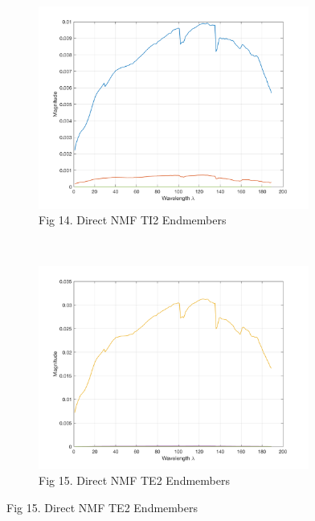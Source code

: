 \documentclass[journal]{IEEEtran}
\begin{document}
\begin{figure}[!t]
    \captionsetup[subfigure]{labelformat=empty}
    \begin{subfigure}[t]{0.5\textwidth}
    \centering
    \includegraphics[width=3.5in]{direct_ti2_nmf_endmembers.png}
    \caption{Fig 14. Direct NMF TI2 Endmembers}
    \label{fig:direct_nmf_ti2_endmembers}
    \end{subfigure}
~
    \begin{subfigure}[t]{0.5\textwidth}
    \centering
    \includegraphics[width=3.5in]{direct_te2_nmf_endmembers.png}
    \caption{Fig 15. Direct NMF TE2 Endmembers}
    \label{fig:direct_nmf_te2_endmembers}
    \end{subfigure}


\end{figure}
\end{document}
